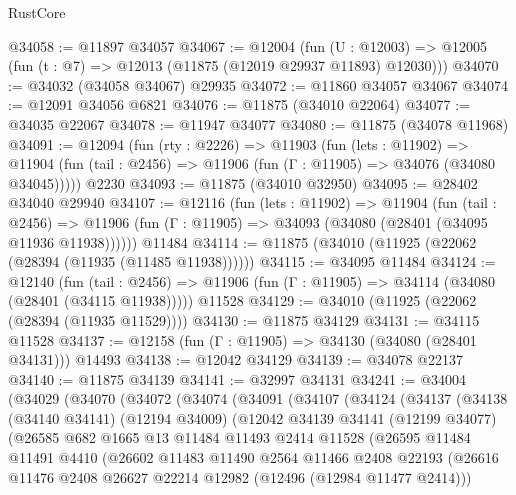 \begin{lexlean}{RustCore}
\begin{coremodule}
@34058 := @11897 @34057
@34067 := @12004
    (fun (U : @12003) => @12005 (fun (t : @7) => @12013 (@11875 (@12019 @29937 @11893) @12030)))
@34070 := @34032 (@34058 @34067) @29935
@34072 := @11860 @34057 @34067
@34074 := @12091 @34056 @6821
@34076 := @11875 (@34010 @22064)
@34077 := @34035 @22067
@34078 := @11947 @34077
@34080 := @11875 (@34078 @11968)
@34091 := @12094
    (fun (rty : @2226) =>
    @11903
      (fun (lets : @11902) =>
      @11904 (fun (tail : @2456) => @11906 (fun (Γ : @11905) => @34076 (@34080 @34045)))))
    @2230
@34093 := @11875 (@34010 @32950)
@34095 := @28402 @34040 @29940
@34107 := @12116
    (fun (lets : @11902) =>
    @11904
      (fun (tail : @2456) =>
      @11906 (fun (Γ : @11905) => @34093 (@34080 (@28401 (@34095 @11936 @11938))))))
    @11484
@34114 := @11875 (@34010 (@11925 (@22062 (@28394 (@11935 (@11485 @11938))))))
@34115 := @34095 @11484
@34124 := @12140
    (fun (tail : @2456) => @11906 (fun (Γ : @11905) => @34114 (@34080 (@28401 (@34115 @11938)))))
    @11528
@34129 := @34010 (@11925 (@22062 (@28394 (@11935 @11529))))
@34130 := @11875 @34129
@34131 := @34115 @11528
@34137 := @12158 (fun (Γ : @11905) => @34130 (@34080 (@28401 @34131))) @14493
@34138 := @12042 @34129
@34139 := @34078 @22137
@34140 := @11875 @34139
@34141 := @32997 @34131
@34241 := @34004
    (@34029
      (@34070
        (@34072
          (@34074
            (@34091
              (@34107
                (@34124
                  (@34137
                    (@34138
                      (@34140 @34141)
                      (@12194 @34009)
                      (@12042
                        @34139
                        @34141
                        (@12199 @34077)
                        (@26585
                          @682
                          @1665
                          @13
                          @11484
                          @11493
                          @2414
                          @11528
                          (@26595
                            @11484
                            @11491
                            @4410
                            (@26602
                              @11483
                              @11490
                              @2564
                              @11466
                              @2408
                              @22193
                              (@26616
                                @11476
                                @2408
                                @26627
                                @22214
                                @12982
                                (@12496 (@12984 @11477 @2414)))

\end{coremodule}
\end{lexlean}
